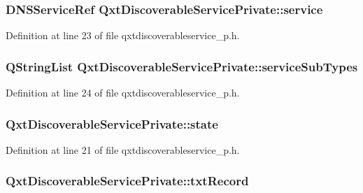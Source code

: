 \hypertarget{class_qxt_discoverable_service_private_a89f3ba9a5aad5e68434a2d4d050d2cfc}{
\subsubsection[{service}]{\setlength{\rightskip}{0pt plus 5cm}D\-N\-S\-Service\-Ref Qxt\-Discoverable\-Service\-Private\-::service}}\label{class_qxt_discoverable_service_private_a89f3ba9a5aad5e68434a2d4d050d2cfc}


Definition at line 23 of file qxtdiscoverableservice\-\_\-p.\-h.

\hypertarget{class_qxt_discoverable_service_private_af7af4f4e5de28787c111324f62a29659}{
\subsubsection[{service\-Sub\-Types}]{\setlength{\rightskip}{0pt plus 5cm}Q\-String\-List Qxt\-Discoverable\-Service\-Private\-::service\-Sub\-Types}}\label{class_qxt_discoverable_service_private_af7af4f4e5de28787c111324f62a29659}


Definition at line 24 of file qxtdiscoverableservice\-\_\-p.\-h.

\hypertarget{class_qxt_discoverable_service_private_ae6e96ea9bca35f6a76b1183ca8528dee}{
\subsubsection[{state}]{ Qxt\-Discoverable\-Service\-Private\-::state}}\label{class_qxt_discoverable_service_private_ae6e96ea9bca35f6a76b1183ca8528dee}


Definition at line 21 of file qxtdiscoverableservice\-\_\-p.\-h.

\hypertarget{class_qxt_discoverable_service_private_a5cc7b131c2e8cda3147b7218b2a455d6}{
\subsubsection[{txt\-Record}]{ Qxt\-Discoverable\-Service\-Private\-::txt\-Record}}\label{class_qxt_discoverable_service_private_a5cc7b131c2e8cda3147b7218b2a455d6}


